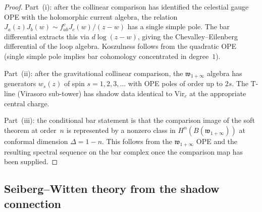 \begin{proof}
Part~(i): after the collinear comparison has identified the celestial
gauge OPE with the holomorphic current algebra, the relation
$J_a(z)J_b(w) \sim
f^c_{ab}J_c(w)/(z{-}w)$ has a single simple pole.
The bar differential extracts this via $d\log(z{-}w)$,
giving the Chevalley--Eilenberg differential of the
loop algebra. Koszulness follows from the quadratic
OPE (single simple pole implies bar cohomology concentrated
in degree~$1$).

Part~(ii): after the gravitational collinear comparison, the
$\mathfrak{w}_{1+\infty}$ algebra has
generators $w_s(z)$ of spin $s = 1, 2, 3, \ldots$ with
OPE poles of order up to $2s$. The T-line
(Virasoro sub-tower) has shadow data identical to
$\mathrm{Vir}_c$ at the appropriate central charge.

Part~(iii): the conditional bar statement is that the comparison image
of the soft theorem at order~$n$ is represented by a nonzero class in
$H^n(B(\mathfrak{w}_{1+\infty}))$ at conformal dimension
$\Delta = 1 - n$. This follows from the
$\mathfrak{w}_{1+\infty}$ OPE and the resulting spectral sequence on
the bar complex once the comparison map has been supplied.
\end{proof}

%
%

\subsection{Seiberg--Witten theory from the shadow connection}
\label{subsec:frontier-seiberg-witten}

